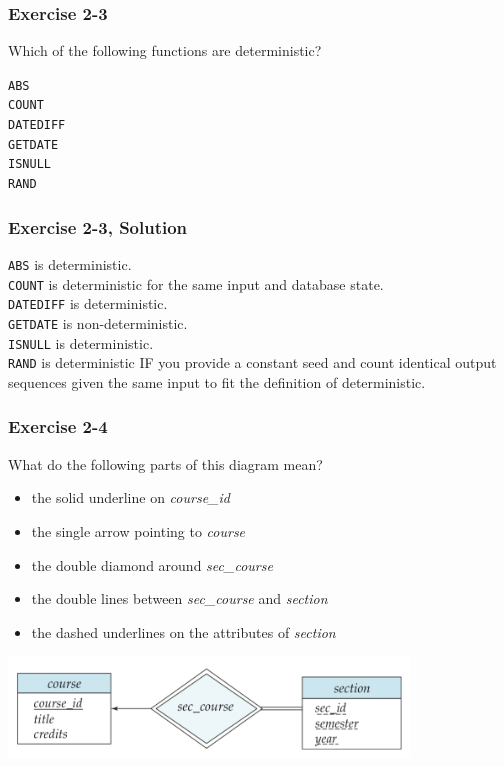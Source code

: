 \begin{frame}
\frametitle{Exercise 2-3}

Which of the following functions are deterministic?

\texttt{ABS} \\
\texttt{COUNT} \\
\texttt{DATEDIFF} \\
\texttt{GETDATE} \\
\texttt{ISNULL} \\
\texttt{RAND} \\

\end{frame}


\begin{frame}
\frametitle{Exercise 2-3, Solution}

\texttt{ABS} is deterministic. \\
\texttt{COUNT} is deterministic for the same input and database state. \\
\texttt{DATEDIFF} is deterministic. \\
\texttt{GETDATE} is non-deterministic. \\
\texttt{ISNULL} is deterministic. \\
\texttt{RAND} is deterministic IF you provide a constant seed and count identical output sequences given the same input to fit the definition of deterministic.\\

\end{frame}


\begin{frame}
\frametitle{Exercise 2-4}

What do the following parts of this diagram mean?

\begin{itemize}
  \item the solid underline on \textit{course\_id}
  \item the single arrow pointing to \textit{course}
  \item the double diamond around \textit{sec\_course}
  \item the double lines between \textit{sec\_course} and \textit{section}
  \item the dashed underlines on the attributes of \textit{section}
\end{itemize}

\begin{center}
  \includegraphics[width=0.8\textwidth]{images/weak-entity-set}
\end{center}

\end{frame}



